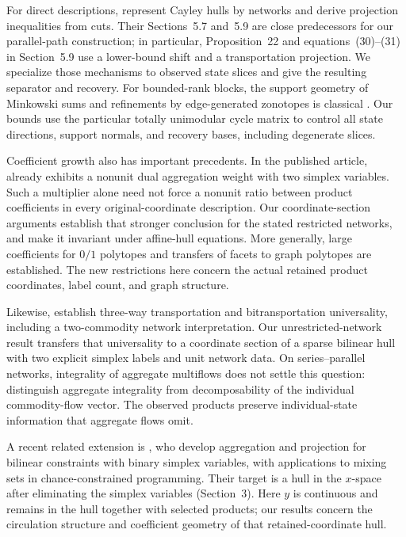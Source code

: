 For direct descriptions, \citet{KisHorvath2022} represent Cayley hulls by
networks and derive projection inequalities from cuts. Their Sections~5.7
and~5.9 are close predecessors for our parallel-path construction; in
particular, Proposition~22 and equations~(30)--(31) in Section~5.9 use a
lower-bound shift and a transportation projection. We specialize those
mechanisms to observed state slices and give the resulting separator and
recovery. For bounded-rank blocks, the support geometry of Minkowski sums
and refinements by edge-generated zonotopes is classical
\citep{GritzmannSturmfels1993,OnnRothblum2004}. Our bounds use the particular
totally unimodular cycle matrix to control all state directions, support
normals, and recovery bases, including degenerate slices.

Coefficient growth also has important precedents. In the published article, \citet[Example~2]{KhademniaDavarnia2025} already exhibits a nonunit dual aggregation
weight with two simplex variables. Such a multiplier alone need not force
a nonunit ratio between product coefficients in every original-coordinate
description. Our coordinate-section arguments establish that stronger
conclusion for the stated restricted networks, and make it invariant under
affine-hull equations. More generally, large coefficients for $0/1$ polytopes
\citep{AlonVu1997} and transfers of facets to graph polytopes
\citep{Fiorini2006} are established. The new restrictions here concern the
actual retained product coordinates, label count, and graph structure.

Likewise, \citet[Theorems~1.1 and~1.2]{DeLoeraOnn2006} establish
three-way transportation and bitransportation universality, including a
two-commodity network interpretation. Our unrestricted-network result
transfers that universality to a coordinate section of a sparse bilinear
hull with two explicit simplex labels and unit network data. On
series--parallel networks, integrality of aggregate multiflows does not
settle this question: \citet[Remark~1]{AlmoghrabiSkutellaWarode2026}
distinguish aggregate integrality from decomposability of the individual
commodity-flow vector. The observed products preserve individual-state
information that aggregate flows omit.

A recent related extension is \citet{DavarniaRahimian2026}, who develop
aggregation and projection for bilinear constraints with binary simplex
variables, with applications to mixing sets in chance-constrained
programming. Their target is a hull in the $x$-space after eliminating the
simplex variables (Section~3). Here $y$ is continuous and remains in the
hull together with selected products; our results concern the circulation
structure and coefficient geometry of that retained-coordinate hull.

